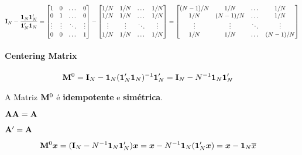 \documentclass[11pt, oneside, a4paper, article]{article}
\numberwithin{equation}{section}
\begin{document}
\begin{description}
\vspace{-1 em}
\begin{align*}
	\mathbf{I}_{N} - \frac{\boldsymbol{1}_{N} \boldsymbol{1}_{N}'}{\boldsymbol{1}_{N}' \boldsymbol{1}_{N}} 
	=
	\begin{bmatrix}
		1      & 0 &\dots  & 0	 \\
		0      & 1 &\dots  & 0	 \\
		\vdots & \vdots & \ddots & \vdots\\
		0      & 0 & \dots  & 1	
	\end{bmatrix}
	-
	\begin{bmatrix}
		1/N    & 1/N    & \dots  & 1/N	 \\
		1/N    & 1/N    & \dots  & 1/N	 \\
		\vdots & \vdots & \ddots & \vdots \\
		1/N    & 1/N    & \dots  & 1/N	
	\end{bmatrix}
	=
	\begin{bmatrix}
		(N-1)/N & 1/N     & \dots  & 1/N    \\
		1/N     & (N-1)/N & \dots  & 1/N    \\
		\vdots  & \vdots  & \ddots & \vdots \\
		1/N     & 1/N     & \dots  & (N-1)/N	
	\end{bmatrix}
\end{align*}

\paragraph{Centering Matrix} \cite[p. 978, A.28]{greene-7ed}

\vspace{-1 em}
\begin{align*}
	\mathbf{M}^{0} &= 
	\mathbf{I}_{N} - \boldsymbol{1}_{N} ( \boldsymbol{1}_{N}' \boldsymbol{1}_{N} )^{-1} \boldsymbol{1}_{N}'
	= 
	\mathbf{I}_{N} - N^{-1} \boldsymbol{1}_{N} \boldsymbol{1}_{N}' 
\end{align*}

A Matriz $\mathbf{M}^{0}$ é \textbf{idempotente} e \textbf{simétrica}.

\begin{description}[noitemsep]
	\item [Idempotência:] $\mathbf{A} \mathbf{A} = \mathbf{A}$
	\item [Simetria:] $\mathbf{A}'=\mathbf{A}$
\end{description}

\vspace{-2 em}
\begin{align*}
\mathbf{M}^{0} \boldsymbol{x} &= 
( \mathbf{I}_{N} - N^{-1} \boldsymbol{1}_{N} \boldsymbol{1}_{N}' ) \boldsymbol{x} 	= 
\boldsymbol{x} - N^{-1} \boldsymbol{1}_{N} (\boldsymbol{1}_{N}' \boldsymbol{x}) = 
\boldsymbol{x} - \boldsymbol{1}_{N} \overline{x}
\end{align*}


\end{description}
\end{document}
